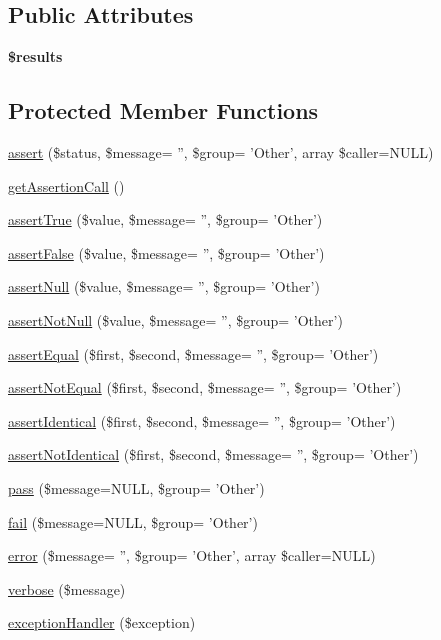 \subsection*{Public Attributes}
\begin{DoxyCompactItemize}
\item 
{\bfseries \$results}
\end{DoxyCompactItemize}
\subsection*{Protected Member Functions}
\begin{DoxyCompactItemize}
\item 
\hyperlink{classDrupalTestCase_ae4722b337aa79fcd753a2fc0c2f0b179}{assert} (\$status, \$message= '', \$group= 'Other', array \$caller=NULL)
\item 
\hyperlink{classDrupalTestCase_a6129193cb03df38244d6149bf88b7c0c}{getAssertionCall} ()
\item 
\hyperlink{classDrupalTestCase_a05171bcd0d7a73b1164502e6477423ff}{assertTrue} (\$value, \$message= '', \$group= 'Other')
\item 
\hyperlink{classDrupalTestCase_a8dbe449ccfc164f64d07a42337e51747}{assertFalse} (\$value, \$message= '', \$group= 'Other')
\item 
\hyperlink{classDrupalTestCase_ab04d0a088003f5e7aac49a4888710cc8}{assertNull} (\$value, \$message= '', \$group= 'Other')
\item 
\hyperlink{classDrupalTestCase_a94d00b7ee53b58205fe55ddc9bff788a}{assertNotNull} (\$value, \$message= '', \$group= 'Other')
\item 
\hyperlink{classDrupalTestCase_ab55dd157dcaed13231e0071a9f114878}{assertEqual} (\$first, \$second, \$message= '', \$group= 'Other')
\item 
\hyperlink{classDrupalTestCase_a76593bb498385ecbbfb9ea3721b1da83}{assertNotEqual} (\$first, \$second, \$message= '', \$group= 'Other')
\item 
\hyperlink{classDrupalTestCase_afe08222abaa77bc367b110804c374298}{assertIdentical} (\$first, \$second, \$message= '', \$group= 'Other')
\item 
\hyperlink{classDrupalTestCase_a77cb46d51231f322d73e12a9ffa92b45}{assertNotIdentical} (\$first, \$second, \$message= '', \$group= 'Other')
\item 
\hyperlink{classDrupalTestCase_a9ced458583ee9de3d82ab1cc09009a01}{pass} (\$message=NULL, \$group= 'Other')
\item 
\hyperlink{classDrupalTestCase_ae90616a11b0e3df050113d79765dc226}{fail} (\$message=NULL, \$group= 'Other')
\item 
\hyperlink{classDrupalTestCase_a4155c3ed4cbf233c259301427dee59fb}{error} (\$message= '', \$group= 'Other', array \$caller=NULL)
\item 
\hyperlink{classDrupalTestCase_a93e92fcdf32bb955e6c7cdfa21356e76}{verbose} (\$message)
\item 
\hyperlink{classDrupalTestCase_ab7cf6472833e2d3fd4de5831cfd61af9}{exceptionHandler} (\$exception)
\end{DoxyCompactItemize}
